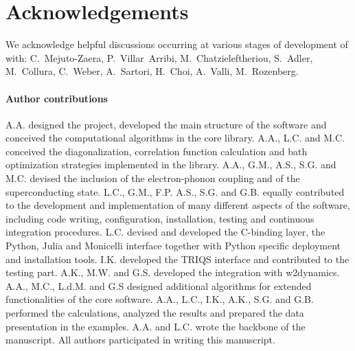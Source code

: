 \documentclass[edipack_sp.tex]{subfiles}
\begin{document}


\section*{Acknowledgements}
We acknowledge helpful discussions occurring at various stages of development of \NAME with: C.~Mejuto-Zaera, P.~Villar~Arribi, M.~Chatzieleftheriou, S.~Adler, M.~Collura, C.~Weber, A.~Sartori, H.~Choi, A.~Valli, M.~Rozenberg.    

\paragraph{Author contributions}
A.A. designed the project, developed the main structure of the software and conceived the computational algorithms in the core library. A.A., L.C. and M.C. conceived the diagonalization, correlation function  calculation and bath optimization strategies implemented in the library. A.A., G.M., A.S., S.G. and M.C. devised the inclusion of the electron-phonon coupling and of the superconducting state. 
L.C., G.M., F.P. A.S., S.G. and G.B. equally contributed to the development and implementation of many different aspects of the software, including code writing, configuration, installation, testing and continuous integration procedures. 
L.C. devised and developed the C-binding layer, the Python, Julia and Monicelli interface together with Python specific deployment and installation tools. 
I.K. developed the TRIQS interface and contributed to the testing part. 
A.K., M.W. and G.S. developed the integration with w2dynamics.  
A.A., M.C., L.d.M. and G.S designed additional algorithms for extended functionalities of the core software.   
A.A., L.C., I.K., A.K., S.G. and G.B. performed the calculations, analyzed the results and prepared the data presentation in the examples.
A.A. and L.C. wrote the backbone of the manuscript.
All authors participated in writing this manuscript. 

\end{document}
